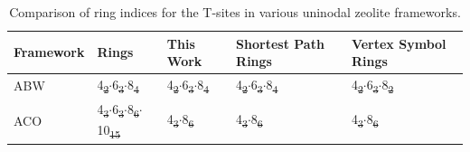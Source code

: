 \documentclass[preprint,numrefs,noinfo,sort&compress]{elsarticle}
\providecommand{\DIFadd}[1]{{\protect\color{blue}\uwave{#1}}} %
\providecommand{\DIFdel}[1]{{\protect\color{red}\sout{#1}}}                      %
\providecommand{\DIFaddFL}[1]{\DIFadd{#1}} %
\providecommand{\DIFdelFL}[1]{\DIFdel{#1}} %
\providecommand{\DIFaddbeginFL}{} %
\providecommand{\DIFaddendFL}{} %
\providecommand{\DIFdelbeginFL}{} %
\providecommand{\DIFdelendFL}{} %
\newcommand{\DIFscaledelfig}{0.5}
\newlength{\DIFdelgraphicswidth} %
\newlength{\DIFdelgraphicsheight} %
\newcommand{\DIFaddincludegraphics}[2][]{{\color{blue}\fbox{\DIFOincludegraphics[#1]{#2}}}} %
\newcommand{\DIFdelincludegraphics}[2][]{%
\sbox{\DIFdelgraphicsbox}{\DIFOincludegraphics[#1]{#2}}%
\settoboxwidth{\DIFdelgraphicswidth}{\DIFdelgraphicsbox} %
\settoboxtotalheight{\DIFdelgraphicsheight}{\DIFdelgraphicsbox} %
\scalebox{\DIFscaledelfig}{%
\parbox[b]{\DIFdelgraphicswidth}{\usebox{\DIFdelgraphicsbox}\\[-\baselineskip] \rule{\DIFdelgraphicswidth}{0em}}\llap{\resizebox{\DIFdelgraphicswidth}{\DIFdelgraphicsheight}{%
\setlength{\unitlength}{\DIFdelgraphicswidth}%
\begin{picture}(1,1)%
\thicklines\linethickness{2pt} %
{\color[rgb]{1,0,0}\put(0,0){\framebox(1,1){}}}%
{\color[rgb]{1,0,0}\put(0,0){\line( 1,1){1}}}%
{\color[rgb]{1,0,0}\put(0,1){\line(1,-1){1}}}%
\end{picture}%
}\hspace*{3pt}}} %
} %
\DeclareRobustCommand{\DIFaddbeginFL}{\DIFOaddbeginFL \let\includegraphics\DIFaddincludegraphics} %
\DeclareRobustCommand{\DIFaddendFL}{\DIFOaddendFL \let\includegraphics\DIFOincludegraphics} %
\DeclareRobustCommand{\DIFdelbeginFL}{\DIFOdelbeginFL \let\includegraphics\DIFdelincludegraphics} %
\DeclareRobustCommand{\DIFdelendFL}{\DIFOaddendFL \let\includegraphics\DIFOincludegraphics} %
\begin{document}
\begin{table}
\centering
\begin{threeparttable}
\caption{Comparison of ring indices for the T-sites in various uninodal zeolite frameworks. \label{tab:uninodal}}
{\scriptsize
\begin{tabular}{lllll}
\hline
Framework & Rings & This Work & Shortest Path Rings \cite{sastre-topological-2009} & Vertex Symbol Rings \cite{baerlocher-database-nodate}\\
\hline
ABW & 4\DIFdelbeginFL \DIFdelFL{\textsubscript{2}\(\cdot\)}\DIFdelendFL \DIFaddbeginFL \DIFaddFL{\(_{\text{2}} \cdot\)}\DIFaddendFL 6\DIFdelbeginFL \DIFdelFL{\textsubscript{3}\(\cdot\)}\DIFdelendFL \DIFaddbeginFL \DIFaddFL{\(_{\text{3}} \cdot\)}\DIFaddendFL 8\DIFdelbeginFL \DIFdelFL{\textsubscript{4} }\DIFdelendFL \DIFaddbeginFL \DIFaddFL{\(_{\text{4}}\) }\DIFaddendFL & 4\DIFdelbeginFL \DIFdelFL{\textsubscript{2}\(\cdot\)}\DIFdelendFL \DIFaddbeginFL \DIFaddFL{\(_{\text{2}} \cdot\)}\DIFaddendFL 6\DIFdelbeginFL \DIFdelFL{\textsubscript{3}\(\cdot\)}\DIFdelendFL \DIFaddbeginFL \DIFaddFL{\(_{\text{3}} \cdot\)}\DIFaddendFL 8\DIFdelbeginFL \DIFdelFL{\textsubscript{4} }\DIFdelendFL \DIFaddbeginFL \DIFaddFL{\(_{\text{4}}\) }\DIFaddendFL & 4\DIFdelbeginFL \DIFdelFL{\textsubscript{2}\(\cdot\)}\DIFdelendFL \DIFaddbeginFL \DIFaddFL{\(_{\text{2}} \cdot\)}\DIFaddendFL 6\DIFdelbeginFL \DIFdelFL{\textsubscript{3}\(\cdot\)}\DIFdelendFL \DIFaddbeginFL \DIFaddFL{\(_{\text{3}} \cdot\)}\DIFaddendFL 8\DIFdelbeginFL \DIFdelFL{\textsubscript{4} }\DIFdelendFL \DIFaddbeginFL \DIFaddFL{\(_{\text{4}}\) }\DIFaddendFL & 4\DIFdelbeginFL \DIFdelFL{\textsubscript{2}\(\cdot\)}\DIFdelendFL \DIFaddbeginFL \DIFaddFL{\(_{\text{2}} \cdot\)}\DIFaddendFL 6\DIFdelbeginFL \DIFdelFL{\textsubscript{3}\(\cdot\)}\DIFdelendFL \DIFaddbeginFL \DIFaddFL{\(_{\text{3}} \cdot\)}\DIFaddendFL 8\DIFdelbeginFL \DIFdelFL{\textsubscript{2}}\DIFdelendFL \DIFaddbeginFL \DIFaddFL{\(_{\text{2}}\)}\DIFaddendFL \\
ACO & 4\DIFdelbeginFL \DIFdelFL{\textsubscript{3}\(\cdot\)}\DIFdelendFL \DIFaddbeginFL \DIFaddFL{\(_{\text{3}} \cdot\)}\DIFaddendFL 6\DIFdelbeginFL \DIFdelFL{\textsubscript{3}\(\cdot\)}\DIFdelendFL \DIFaddbeginFL \DIFaddFL{\(_{\text{3}} \cdot\)}\DIFaddendFL 8\DIFdelbeginFL \DIFdelFL{\textsubscript{6}\(\cdot\)}\DIFdelendFL \DIFaddbeginFL \DIFaddFL{\(_{\text{6}} \cdot\)}\DIFaddendFL 10\DIFdelbeginFL \DIFdelFL{\textsubscript{15} }\DIFdelendFL \DIFaddbeginFL \DIFaddFL{\(_{\text{15}}\) }\DIFaddendFL & 4\DIFdelbeginFL \DIFdelFL{\textsubscript{3}\(\cdot\)}\DIFdelendFL \DIFaddbeginFL \DIFaddFL{\(_{\text{3}} \cdot\)}\DIFaddendFL 8\DIFdelbeginFL \DIFdelFL{\textsubscript{6} }\DIFdelendFL \DIFaddbeginFL \DIFaddFL{\(_{\text{6}}\) }\DIFaddendFL & 4\DIFdelbeginFL \DIFdelFL{\textsubscript{3}\(\cdot\)}\DIFdelendFL \DIFaddbeginFL \DIFaddFL{\(_{\text{3}} \cdot\)}\DIFaddendFL 8\DIFdelbeginFL \DIFdelFL{\textsubscript{6} }\DIFdelendFL \DIFaddbeginFL \DIFaddFL{\(_{\text{6}}\) }\DIFaddendFL & 4\DIFdelbeginFL \DIFdelFL{\textsubscript{3}\(\cdot\)}\DIFdelendFL \DIFaddbeginFL \DIFaddFL{\(_{\text{3}} \cdot\)}\DIFaddendFL 8\DIFdelbeginFL \DIFdelFL{\textsubscript{6}}\DIFdelendFL \DIFaddbeginFL \DIFaddFL{\(_{\text{6}}\)}\DIFaddendFL \\

\end{tabular}}
\end{threeparttable}
\end{table}
\end{document}
